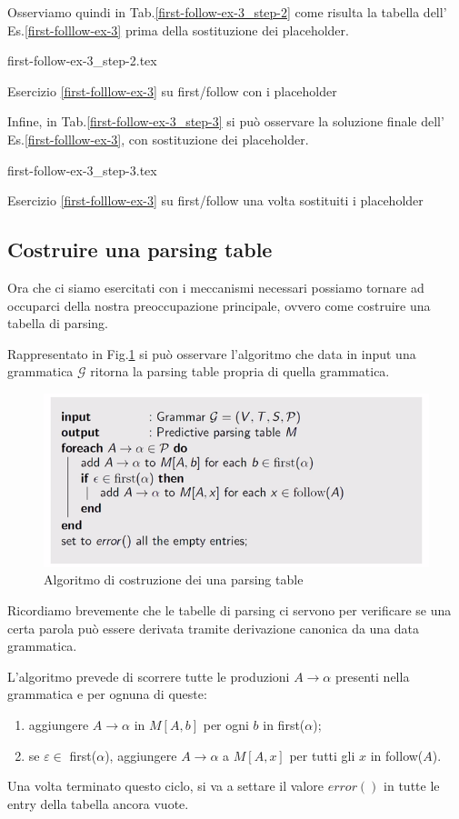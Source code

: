 \documentclass[class=book, crop=false, oneside, 12pt]{standalone}
\begin{document}
Osserviamo quindi in Tab.\ref{first-follow-ex-3_step-2} come risulta la tabella dell' Es.\ref{first-folllow-ex-3} prima della sostituzione dei placeholder.
\begin{table}[H]
	\centering
	{first-follow-ex-3_step-2.tex}
    \caption{Esercizio \ref{first-folllow-ex-3} su first/follow con i placeholder}
    \label{first-follow-ex-3_step-2}
\end{table}
Infine, in Tab.\ref{first-follow-ex-3_step-3} si può osservare la soluzione finale dell' Es.\ref{first-folllow-ex-3}, con sostituzione dei placeholder.
\begin{table}[H]
	\centering
	{first-follow-ex-3_step-3.tex}
    \caption{Esercizio \ref{first-folllow-ex-3} su first/follow una volta sostituiti i placeholder}
    \label{first-follow-ex-3_step-3}
\end{table}

\subsection{Costruire una parsing table}
Ora che ci siamo esercitati con i meccanismi necessari possiamo tornare ad occuparci della nostra preoccupazione principale, ovvero come costruire una tabella di parsing.

Rappresentato in Fig.\ref{algoritmo_parsing-table} si può osservare l'algoritmo che data in input una grammatica \(\mathcal{G}\) ritorna la parsing table propria di quella grammatica. 
\begin{figure}[htb]
    \centering
    \includegraphics[width=.8\textwidth]{algoritmo_parsing-table.png}
    \caption{Algoritmo di costruzione dei una parsing table}
    \label{algoritmo_parsing-table}
\end{figure}
Ricordiamo brevemente che le tabelle di parsing ci servono per verificare se una certa parola può essere derivata tramite derivazione canonica da una data grammatica.

L'algoritmo prevede di scorrere tutte le produzioni \(A \to \alpha\) presenti nella grammatica e per ognuna di queste:
\begin{enumerate}
    \item aggiungere \(A \to \alpha\) in \(M[A, b]\) per ogni \(b\) in first(\(\alpha\));
    \item se  \(\varepsilon \in\) first(\(\alpha\)), aggiungere \(A \to \alpha\) a \(M[A, x]\) per tutti gli \(x\) in follow(\(A\)). 
\end{enumerate}
Una volta terminato questo ciclo, si va a settare il valore \(error()\) in tutte le entry della tabella ancora vuote.
\end{document}
